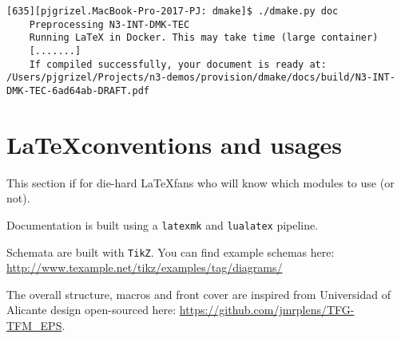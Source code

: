 \begin{lstlisting}[style=console]
    [635][pjgrizel.MacBook-Pro-2017-PJ: dmake]$ ./dmake.py doc
    Preprocessing N3-INT-DMK-TEC
    Running LaTeX in Docker. This may take time (large container)
    [.......]
    If compiled successfully, your document is ready at: /Users/pjgrizel/Projects/n3-demos/provision/dmake/docs/build/N3-INT-DMK-TEC-6ad64ab-DRAFT.pdf
\end{lstlisting}


\section{\LaTeX conventions and usages}

This section if for die-hard \LaTeX fans who will know which modules to use (or not).

Documentation is built using a \texttt{latexmk} and \texttt{lualatex} pipeline.

Schemata are built with \texttt{TikZ}. You can find example schemas here: \url{http://www.texample.net/tikz/examples/tag/diagrams/}

The overall structure, macros and front cover are inspired from Universidad of Alicante design open-sourced here: \url{https://github.com/jmrplens/TFG-TFM_EPS}.
